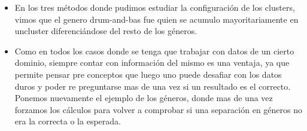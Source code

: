 \begin{itemize}
\item En los tres métodos donde pudimos estudiar la configuración de los clusters, vimos que el genero drum-and-bas fue quien se acumulo mayoritariamente en uncluster diferenciándose del resto de los géneros. 

\item Como en todos los casos donde se tenga que trabajar con datos de un cierto dominio, siempre contar con información del mismo es una ventaja, ya que permite pensar pre conceptos que luego uno puede desafiar con los datos duros y poder re preguntarse mas de una vez si un resultado es el correcto. Ponemos nuevamente el ejemplo de los géneros, donde mas de una vez forzamos los cálculos para volver a comprobar si una separación en géneros no era la correcta o la esperada.

 \end{itemize}